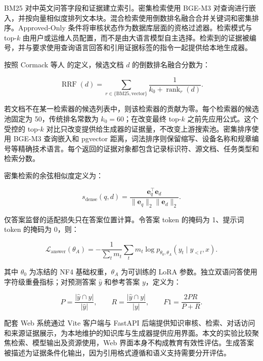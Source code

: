 BM25 对中英文问答字段和证据建立索引。密集检索使用 BGE-M3 对查询进行嵌入，并按向量相似度排列文本块。混合检索使用倒数排名融合合并关键词和密集排序。Approved-Only 条件将审核状态作为数据库层面的资格过滤器。检索模式与 top-$k$ 由用户或运维人员配置，而不是由大语言模型自主选择。检索到的证据被编号，并与要求使用查询语言回答和引用证据标签的指令一起提供给本地生成器。

\begin{samepage}
按照 Cormack 等人 \citep{cormack2009rrf} 的定义，候选文档 $d$ 的倒数排名融合分数为：

\begin{equation}
\operatorname{RRF}(d)=\sum_{r \in \{\mathrm{BM25},\mathrm{vector}\}}\frac{1}{k_0+\operatorname{rank}_r(d)}.
\end{equation}
\end{samepage}

若文档不在某一检索器的候选列表中，则该检索器的贡献为零。每个检索器的候选池固定为 50，传统排名常数为 $k_0=60$；在改变最终 top-$k$ 之前先应用公式。这个受控的 top-$k$ 对比只改变提供给生成器的证据量，不改变上游搜索池。密集排序使用 BGE-M3 查询嵌入和 pgvector 距离，词法排序则保留缩写、设备名称和规章编号等精确技术语言。每个返回的证据对象都包含记录标识符、源文档、任务类型和检索分数。

密集检索的余弦相似度定义为：

\begin{equation}
s_{\mathrm{dense}}(q,d)=\frac{\mathbf{e}_q^{\top}\mathbf{e}_d}{\lVert\mathbf{e}_q\rVert_2\lVert\mathbf{e}_d\rVert_2}.
\end{equation}

仅答案监督的适配损失只在答案位置计算。令答案 token 的掩码为 1、提示词 token 的掩码为 0，则：

\begin{equation}
\mathcal{L}_{\mathrm{answer}}(\theta_A)=-\frac{1}{\sum_t m_t}\sum_t m_t\log p_{\theta_0,\theta_A}(y_t\mid y_{<t},x).
\end{equation}

其中 $\theta_0$ 为冻结的 NF4 基础权重，$\theta_A$ 为可训练的 LoRA 参数。独立双语问答使用字符级重叠指标；对预测答案 $\hat{y}$ 和参考答案 $y$，定义为：

\begin{equation}
P=\frac{|\hat{y}\cap y|}{|\hat{y}|},\qquad R=\frac{|\hat{y}\cap y|}{|y|},\qquad F1=\frac{2PR}{P+R}.
\end{equation}

配套 Web 系统通过 Vite 客户端与 FastAPI 后端提供知识审核、检索、对话访问和来源证据展示，为本地维护的知识库与生成器提供应用界面。本文的实验比较聚焦检索、模型输出及资源使用，Web 界面本身不构成教育有效性评估。生成答案被描述为证据条件化输出，因为引用格式遵循和语义支持需要分开评估。


